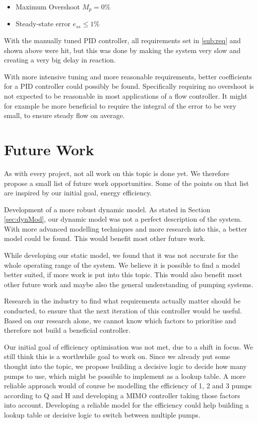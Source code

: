 \begin{itemize}
\item Maximum Overshoot $M_p = 0\%$
\item Steady-state error $e_{ss} \leq 1 \%$
\end{itemize}

With the manually tuned PID controller,
all requirements set in \ref{sub:req} and shown above were hit,
but this was done by making the system very slow and creating a very big delay in reaction.

With more intensive tuning and more reasonable requirements,
better coefficients for a PID controller could possibly be found.
Specifically requiring no overshoot is not expected to be reasonable in most applications of a flow controller.
It might for example be more beneficial to require the integral of the error to be very small,
to ensure steady flow on average.

\section{Future Work} \label{sec:future}
As with every project, not all work on this topic is done yet.
We therefore propose a small list of future work opportunities.
Some of the points on that list are inspired by our initial goal,
energy efficiency.

Development of a more robust dynamic model.
As stated in Section \ref{sec:dynMod},
our dynamic model was not a perfect description of the system.
With more advanced modelling techniques and more research into this,
a better model could be found.
This would benefit most other future work.

While developing our static model,
we found that it was not accurate for the whole operating range of the system.
We believe it is possible to find a model better suited,
if more work is put into this topic.
This would also benefit most other future work
and maybe also the general understanding of pumping systems.

Research in the industry to find what requirements actually matter should be conducted,
to ensure that the next iteration of this controller would be useful.
Based on our research alone,
we cannot know which factors to prioritise
and therefore not build a beneficial controller.

Our initial goal of efficiency optimisation was not met,
due to a shift in focus.
We still think this is a worthwhile goal to work on.
Since we already put some thought into the topic,
we propose building a decisive logic to decide how many pumps to use,
which might be possible to implement as a lookup table.
A more reliable approach would of course be modelling the efficiency of 1, 2 and 3 pumps according to Q and H
and developing a MIMO controller taking those factors into account.
Developing a reliable model for the efficiency could help building a lookup table or decisive logic to switch between multiple pumps.
